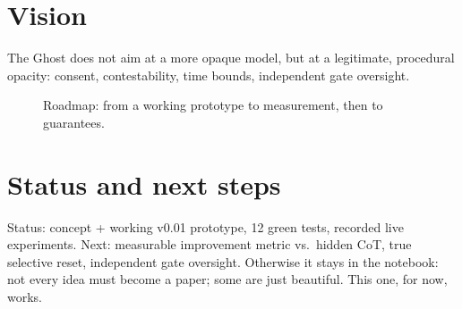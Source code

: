 \documentclass[11pt,a4paper]{article}
\begin{document}
\section{Vision}
The Ghost does not aim at a more opaque model, but at a legitimate, procedural opacity:
consent, contestability, time bounds, independent gate oversight.

\begin{figure}[h]
\centering
{}
\caption{Roadmap: from a working prototype to measurement, then to guarantees.}
\end{figure}

\section{Status and next steps}
Status: concept + working v0.01 prototype, 12 green tests, recorded live experiments.
Next: measurable improvement metric vs.\ hidden CoT, true selective reset, independent
gate oversight. Otherwise it stays in the notebook: not every idea must become a paper;
some are just beautiful. This one, for now, works.
\end{document}
